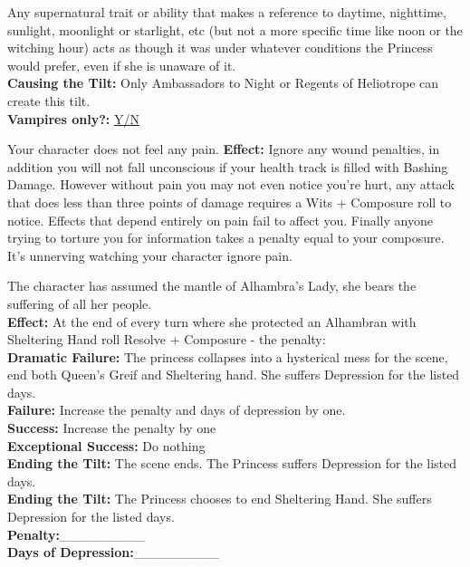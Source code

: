 \documentclass[10pt, frontgrid, backgrid]{flacards}
\begin{document}
{Any supernatural trait or ability that makes a reference to daytime, nighttime, sunlight, moonlight or starlight, etc (but not a more specific time like noon or the witching hour) acts as though it was under whatever conditions the Princess would prefer, even if she is unaware of it.\\ 

\textbf{Causing the Tilt:} Only Ambassadors to Night or Regents of Heliotrope can create this tilt.\\
\textbf{Vampires only?:} \underline{Y/N}}


{Your character does not feel any pain. 
\textbf{Effect:} Ignore any wound penalties, in addition you will not fall unconscious if your health track is filled with Bashing Damage. However without pain you may not even notice you're hurt, any attack that does less than three points of damage requires a Wits + Composure roll to notice. Effects that depend entirely on pain fail to affect you. Finally anyone trying to torture you for information takes a penalty equal to your composure. It's unnerving watching your character ignore pain.}


{The character has assumed the mantle of Alhambra's Lady, she bears the suffering of all her people.\\
\textbf{Effect:} At the end of every turn where she protected an Alhambran with Sheltering Hand roll Resolve + Composure - the penalty: \\
\textbf{Dramatic Failure:} The princess collapses into a hysterical mess for the scene, end both Queen's Greif and Sheltering hand. She suffers Depression for the listed days.\\
\textbf{Failure:} Increase the penalty and days of depression by one.\\
\textbf{Success:} Increase the penalty by one\\
\textbf{Exceptional Success:} Do nothing\\
\textbf{Ending the Tilt:} The scene ends. The Princess suffers Depression for the listed days.\\
\textbf{Ending the Tilt:} The Princess chooses to end Sheltering Hand. She suffers Depression for the listed days.\\
\textbf{Penalty:}\_\_\_\_\_\_\_\_\_\\
\textbf{Days of Depression:}\_\_\_\_\_\_\_\_\_}
\end{document}
